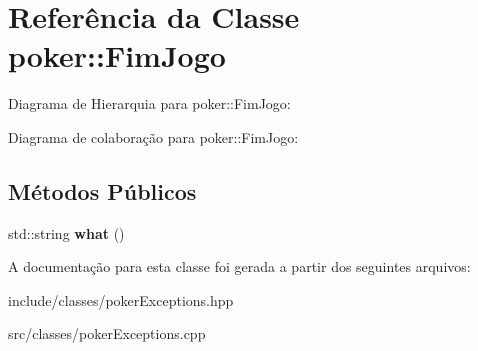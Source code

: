 \hypertarget{classpoker_1_1FimJogo}{}\section{Referência da Classe poker\+:\+:Fim\+Jogo}
\label{classpoker_1_1FimJogo}


Diagrama de Hierarquia para poker\+:\+:Fim\+Jogo\+:


Diagrama de colaboração para poker\+:\+:Fim\+Jogo\+:
\subsection*{Métodos Públicos}
\begin{DoxyCompactItemize}
\item 
\mbox{\label{classpoker_1_1FimJogo_aca7b4f7d8f8008134183c8279bb0b5ae}} 
std\+::string {\bfseries what} ()
\end{DoxyCompactItemize}


A documentação para esta classe foi gerada a partir dos seguintes arquivos\+:\begin{DoxyCompactItemize}
\item 
include/classes/poker\+Exceptions.\+hpp\item 
src/classes/poker\+Exceptions.\+cpp\end{DoxyCompactItemize}
